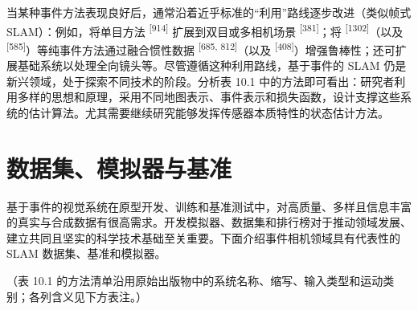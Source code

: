 当某种事件方法表现良好后，通常沿着近乎标准的“利用”路线逐步改进（类似帧式 SLAM）：例如，将单目方法 \textsuperscript{[914]} 扩展到双目或多相机场景 \textsuperscript{[381]}；将 \textsuperscript{[1302]}（以及 \textsuperscript{[585]}）等纯事件方法通过融合惯性数据 \textsuperscript{[685, 812]}（以及 \textsuperscript{[408]}）增强鲁棒性；还可扩展基础系统以处理全向镜头等。尽管遵循这种利用路线，基于事件的 SLAM 仍是新兴领域，处于探索不同技术的阶段。分析表 10.1 中的方法即可看出：研究者利用多样的思想和原理，采用不同地图表示、事件表示和损失函数，设计支撑这些系统的估计算法。尤其需要继续研究能够发挥传感器本质特性的状态估计方法。

\section{数据集、模拟器与基准}

基于事件的视觉系统在原型开发、训练和基准测试中，对高质量、多样且信息丰富的真实与合成数据有很高需求。开发模拟器、数据集和排行榜对于推动领域发展、建立共同且坚实的科学技术基础至关重要。下面介绍事件相机领域具有代表性的 SLAM 数据集、基准和模拟器。

（表 10.1 的方法清单沿用原始出版物中的系统名称、缩写、输入类型和运动类别；各列含义见下方表注。）

